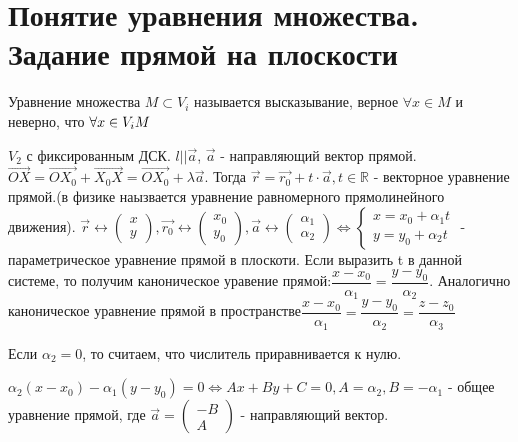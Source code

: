 \section{Понятие уравнения множества. Задание прямой на плоскости}
\begin{definition}
	Уравнение множества \(M\subset V_i\) называется высказывание, верное $\forall x\in M$ и неверно, что $\forall x\in V_i \\ M$ 
\end{definition}
\(V_2\) с фиксированным ДСК. \(l || \vec a\), \(\vec a\) - направляющий вектор прямой. \(\vec{OX} = \vec{OX_0}+\vec{X_0X} = \vec{OX_0} + \lambda \vec{a}\). Тогда \(\vec{r} = \vec{r_0} + t\cdot\vec{a}, t\in \mathbb{R}\) - векторное уравнение прямой.(в физике наызвается уравнение равномерного прямолинейного движения).
\(\vec r \longleftrightarrow \begin{pmatrix}
	x \\ y
\end{pmatrix}, 
\vec{r_0}\longleftrightarrow \begin{pmatrix}
	x_0 \\ y_0
\end{pmatrix},
\vec a\longleftrightarrow \begin{pmatrix}
	\alpha_1 \\ \alpha_2
\end{pmatrix} \Longleftrightarrow \left\{\begin{gathered}
x = x_0 + \alpha_1t \\
y = y_0 + \alpha_2t
\end{gathered}\right.
\) - параметрическое уравнение прямой в плоскоти. \newline
Если выразить t в данной системе, то получим каноническое уравение прямой:\newline \(\dfrac{x - x_0}{\alpha_1} = \dfrac{y - y_0}{\alpha_2}\). Аналогично каноническое уравнение прямой в пространстве\newline\(\dfrac{x - x_0}{\alpha_1} = \dfrac{y - y_0}{\alpha_2} = \dfrac{z - z_0}{\alpha_3}\)
\begin{note}
	Если $\alpha_2 = 0$, то считаем, что числитель приравнивается к нулю.
\end{note}
$\alpha_2(x - x_0) - \alpha_1(y - y_0) = 0 \Longleftrightarrow Ax+By+C = 0, A = \alpha_2, B = - \alpha_1$ - общее уравнение прямой, где \(\vec a = \begin{pmatrix}
	-B \\ A
\end{pmatrix}\) - направляющий вектор.
